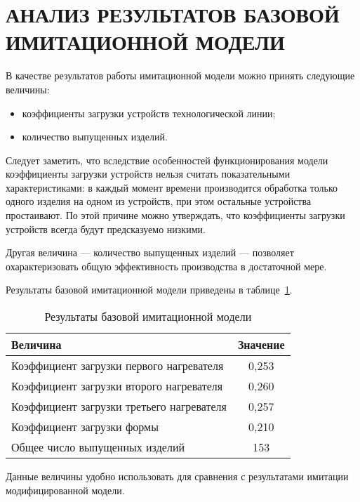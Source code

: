 \section[Анализ результатов базовой имитационной модели]{
  АНАЛИЗ РЕЗУЛЬТАТОВ БАЗОВОЙ \\
  ИМИТАЦИОННОЙ МОДЕЛИ}
\label{sec:base_analysis}

В качестве результатов работы имитационной модели можно принять
следующие величины: 

\begin{itemize}
  \item коэффициенты загрузки устройств технологической линии;
  \item количество выпущенных изделий.
\end{itemize}

Следует заметить, что вследствие особенностей функционирования модели
коэффициенты загрузки устройств нельзя считать показательными характеристиками:
в каждый момент времени производится обработка только одного изделия на одном из
устройств, при этом остальные устройства простаивают.
По этой причине можно утверждать, что коэффициенты загрузки устройств
всегда будут предсказуемо низкими.

Другая величина --- количество выпущенных изделий --- 
позволяет охарактеризовать общую эффективность производства в достаточной мере. 

Результаты базовой имитационной модели приведены в таблице~\ref{tbl:base_result}.

\begin{table}[h!]
  \caption{Результаты базовой имитационной модели}
  \label{tbl:base_result}
    \centering
    \begin{tabular}{| p{} | c |}
      \hline
      Величина & 
      Значение \\
      \hline

      Коэффициент загрузки первого нагревателя &
      0{,}253 \\
      \hline

      Коэффициент загрузки второго нагревателя &
      0{,}260 \\
      \hline

      Коэффициент загрузки третьего нагревателя &
      0{,}257 \\
      \hline

      Коэффициент загрузки формы &
      0{,}210 \\
      \hline

      Общее число выпущенных изделий &
      153 \\
      \hline

    \end{tabular}
\end{table}

Данные величины удобно использовать для сравнения с результатами имитации
модифицированной модели.
